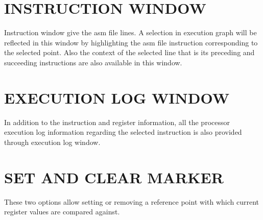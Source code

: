 \section {INSTRUCTION WINDOW}

Instruction window give the asm file lines. A selection in execution graph will be reflected in this window by highlighting the asm file instruction corresponding to the selected point. Also the context of the selected line that is its preceding and succeeding instructions are also available in this window.

\section {EXECUTION LOG WINDOW}

In addition to the instruction and register information, all the processor execution log information regarding the selected instruction is also provided through execution log window.

\section{SET AND CLEAR MARKER}
These two options allow setting or removing a reference point with which current register values are compared against.

